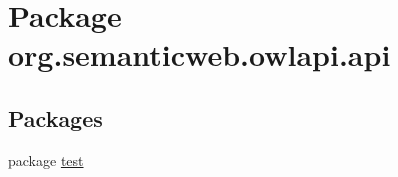 \hypertarget{namespaceorg_1_1semanticweb_1_1owlapi_1_1api}{\section{Package org.\-semanticweb.\-owlapi.\-api}
\label{namespaceorg_1_1semanticweb_1_1owlapi_1_1api}
}
\subsection*{Packages}
\begin{DoxyCompactItemize}
\item 
package \hyperlink{namespaceorg_1_1semanticweb_1_1owlapi_1_1api_1_1test}{test}
\end{DoxyCompactItemize}
